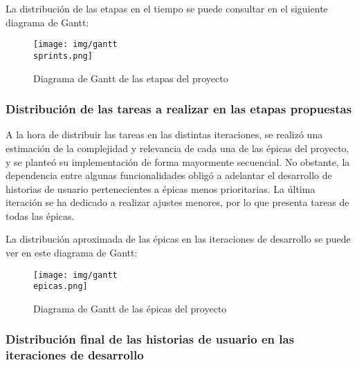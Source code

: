 \documentclass[10pt, a4paper]{aqademic}
\begin{document}
La distribución de las etapas en el tiempo se puede consultar en el siguiente diagrama de Gantt:

\medskip

\begin{figure}[h]
	\centering
	\texttt{[image: img/gantt\\ sprints.png]}
	\caption{Diagrama de Gantt de las etapas del proyecto}
\end{figure}


\subsubsection*{Distribución de las tareas a realizar en las etapas propuestas}

A la hora de distribuir las tareas en las distintas iteraciones, se realizó una estimación de la complejidad y relevancia de cada una de las épicas del proyecto, y se planteó su implementación de forma mayormente secuencial. No obstante, la dependencia entre algunas funcionalidades obligó a adelantar el desarrollo de historias de usuario pertenecientes a épicas menos prioritarias. La última iteración se ha dedicado a realizar ajustes menores, por lo que presenta tareas de todas las épicas.

La distribución aproximada de las épicas en las iteraciones de desarrollo se puede ver en este diagrama de Gantt:

\medskip

\begin{figure}[h]
	\centering
	\texttt{[image: img/gantt\\ epicas.png]}
	\caption{Diagrama de Gantt de las épicas del proyecto}
\end{figure}


\subsubsection*{Distribución final de las historias de usuario en las iteraciones de desarrollo}
\end{document}

